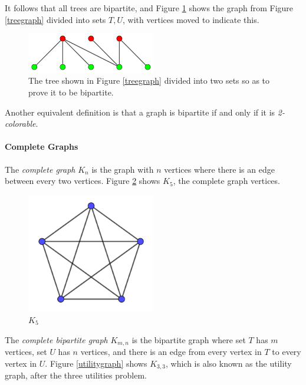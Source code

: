 \documentclass{article}
\begin{document}
	It follows that all trees are bipartite, and Figure \ref{bipartitetree} shows the graph from Figure \ref{treegraph} divided into sets \(T,U\), with vertices moved to indicate this.
	
	\begin{figure}[h]
		\centering
		\includegraphics[width=0.5\textwidth]{bipartitetree}
		\caption{The tree shown in Figure \ref{treegraph} divided into two sets so as to prove it to be bipartite.}
		\label{bipartitetree}
	\end{figure}
	
	Another equivalent definition is that a graph is bipartite if and only if it is \textit{2-colorable}\footnotemark[\ref{definedlater}].
	
	\paragraph{Complete Graphs}
	
	The \textit{complete graph} \(K_n\) is the graph with \(n\) vertices where there is an edge between every two vertices. Figure \ref{k5graph} shows \(K_5\), the complete graph vertices.
	
	\begin{figure}[h]
		\centering
		\includegraphics[width=0.5\textwidth]{k5graph}
		\caption{\(K_5\)}
		\label{k5graph}
	\end{figure}
	
	The \textit{complete bipartite graph} \(K_{m,n}\) is the bipartite graph where set \(T\) has \(m\) vertices, set \(U\) has \(n\) vertices, and there is an edge from every vertex in \(T\) to every vertex in \(U\). Figure \ref{utilitygraph} shows \(K_{3,3}\), which is also known as the utility graph, after the three utilities problem.
	
\end{document}
